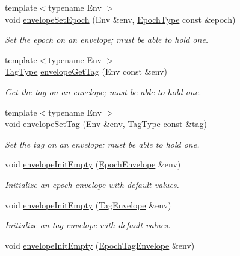 \begin{DoxyCompactItemize}
{\footnotesize template$<$typename Env $>$ }\\void \hyperlink{namespacevt_a4a0a9928690206b588dbcac2afb71088}{envelope\+Set\+Epoch} (Env \&env, \hyperlink{namespacevt_a985a5adf291c34a3ca263b3378388236}{Epoch\+Type} const \&epoch)
\begin{DoxyCompactList}\small\item\em Set the epoch on an envelope; must be able to hold one. \end{DoxyCompactList}\item 
{\footnotesize template$<$typename Env $>$ }\\\hyperlink{namespacevt_a84ab281dae04a52a4b243d6bf62d0e52}{Tag\+Type} \hyperlink{namespacevt_af16ad10e40d8a2f2c1128068774c1bc4}{envelope\+Get\+Tag} (Env const \&env)
\begin{DoxyCompactList}\small\item\em Get the tag on an envelope; must be able to hold one. \end{DoxyCompactList}\item 
{\footnotesize template$<$typename Env $>$ }\\void \hyperlink{namespacevt_a0eb7eef640bbf48bff94e6683be7a3dd}{envelope\+Set\+Tag} (Env \&env, \hyperlink{namespacevt_a84ab281dae04a52a4b243d6bf62d0e52}{Tag\+Type} const \&tag)
\begin{DoxyCompactList}\small\item\em Set the tag on an envelope; must be able to hold one. \end{DoxyCompactList}\item 
void \hyperlink{namespacevt_ae56472f58b6582abacae687ead397380}{envelope\+Init\+Empty} (\hyperlink{namespacevt_af71a025689a3da5037785b53a7a8e78c}{Epoch\+Envelope} \&env)
\begin{DoxyCompactList}\small\item\em Initialize an epoch envelope with default values. \end{DoxyCompactList}\item 
void \hyperlink{namespacevt_a2c8d0d4109460ccb89316ca4b3cc3aea}{envelope\+Init\+Empty} (\hyperlink{namespacevt_a7b951ab92dca9319e12e3fc406ccb309}{Tag\+Envelope} \&env)
\begin{DoxyCompactList}\small\item\em Initialize an tag envelope with default values. \end{DoxyCompactList}\item 
void \hyperlink{namespacevt_a358f72f3e1d5ce12cca7d622ee512302}{envelope\+Init\+Empty} (\hyperlink{namespacevt_af23b58014ced6898422213a0e5e6a27a}{Epoch\+Tag\+Envelope} \&env)

\end{DoxyCompactItemize}
